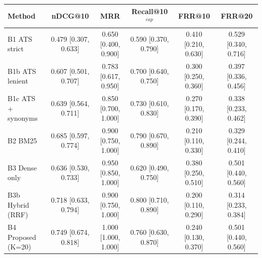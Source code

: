 \begin{tabular}{lccccc}
\toprule
Method & nDCG@10 & MRR & Recall@10$^{cap}$ & FRR@10 & FRR@20 \\
\midrule
B1 ATS strict & 0.479 [0.307, 0.633] & 0.650 [0.400, 0.900] & 0.590 [0.370, 0.790] & 0.410 [0.210, 0.630] & 0.529 [0.340, 0.716] \\
B1b ATS lenient & 0.607 [0.501, 0.707] & 0.783 [0.617, 0.950] & 0.700 [0.640, 0.750] & 0.300 [0.250, 0.360] & 0.397 [0.336, 0.456] \\
B1c ATS + synonyms & 0.639 [0.564, 0.711] & 0.850 [0.700, 1.000] & 0.730 [0.610, 0.830] & 0.270 [0.170, 0.390] & 0.338 [0.233, 0.462] \\
B2 BM25 & 0.685 [0.597, 0.774] & 0.900 [0.750, 1.000] & 0.790 [0.670, 0.890] & 0.210 [0.110, 0.330] & 0.329 [0.244, 0.410] \\
B3 Dense only & 0.636 [0.530, 0.733] & 0.950 [0.850, 1.000] & 0.620 [0.490, 0.750] & 0.380 [0.250, 0.510] & 0.501 [0.440, 0.560] \\
B3b Hybrid (RRF) & 0.718 [0.633, 0.794] & 0.900 [0.750, 1.000] & 0.800 [0.710, 0.890] & 0.200 [0.110, 0.290] & 0.314 [0.233, 0.384] \\
B4 Proposed (K=20) & 0.749 [0.674, 0.818] & 1.000 [1.000, 1.000] & 0.760 [0.630, 0.870] & 0.240 [0.130, 0.370] & 0.501 [0.440, 0.560] \\
\bottomrule
\end{tabular}
